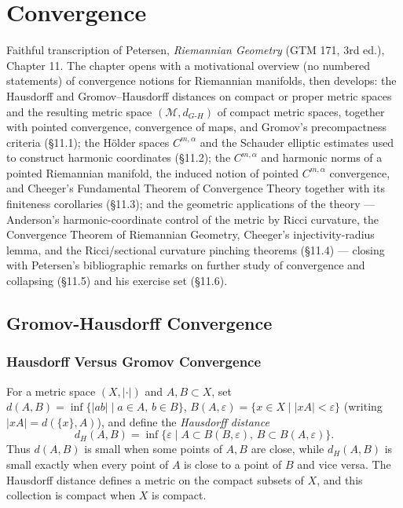 \chapter{Convergence}
\label{chap:pet-convergence}

\newcommand{\Ric}{\operatorname{Ric}}
\newcommand{\Hess}{\operatorname{Hess}}
\newcommand{\vol}{\operatorname{vol}}
\newcommand{\diam}{\operatorname{diam}}
\newcommand{\inj}{\operatorname{inj}}
\newcommand{\sec}{\operatorname{sec}}
\newcommand{\Cap}{\operatorname{Cap}}
\newcommand{\Cov}{\operatorname{Cov}}
\newcommand{\dGH}{d_{G\text{-}H}}

Faithful transcription of Petersen, \emph{Riemannian Geometry} (GTM 171, 3rd
ed.), Chapter 11. The chapter opens with a motivational overview (no numbered
statements) of convergence notions for Riemannian manifolds, then develops:
the Hausdorff and Gromov--Hausdorff distances on compact or proper metric
spaces and the resulting metric space $(\mathcal{M},\dGH)$ of compact metric
spaces, together with pointed convergence, convergence of maps, and Gromov's
precompactness criteria (\S11.1); the Hölder spaces $C^{m,\alpha}$ and the
Schauder elliptic estimates used to construct harmonic coordinates (\S11.2);
the $C^{m,\alpha}$ and harmonic norms of a pointed Riemannian manifold, the
induced notion of pointed $C^{m,\alpha}$ convergence, and Cheeger's
Fundamental Theorem of Convergence Theory together with its finiteness
corollaries (\S11.3); and the geometric applications of the theory —
Anderson's harmonic-coordinate control of the metric by Ricci curvature, the
Convergence Theorem of Riemannian Geometry, Cheeger's injectivity-radius
lemma, and the Ricci/sectional curvature pinching theorems (\S11.4) — closing
with Petersen's bibliographic remarks on further study of convergence and
collapsing (\S11.5) and his exercise set (\S11.6).

\section{Gromov-Hausdorff Convergence}

\subsection{Hausdorff Versus Gromov Convergence}

\begin{definition}
  \label{def:pet-ch11-hausdorff-distance}
  For a metric space $(X,|\cdot|)$ and $A,B\subset X$, set
  $d(A,B)=\inf\{|ab|\mid a\in A,\,b\in B\}$,
  $B(A,\varepsilon)=\{x\in X\mid|xA|<\varepsilon\}$ (writing $|xA|=d(\{x\},A)$),
  and define the \emph{Hausdorff distance}
  \[
    d_H(A,B)=\inf\{\varepsilon\mid A\subset B(B,\varepsilon),\,B\subset B(A,\varepsilon)\}.
  \]
  Thus $d(A,B)$ is small when some points of $A,B$ are close, while
  $d_H(A,B)$ is small exactly when every point of $A$ is close to a point of
  $B$ and vice versa. The Hausdorff distance defines a metric on the compact
  subsets of $X$, and this collection is compact when $X$ is compact.
\end{definition}

